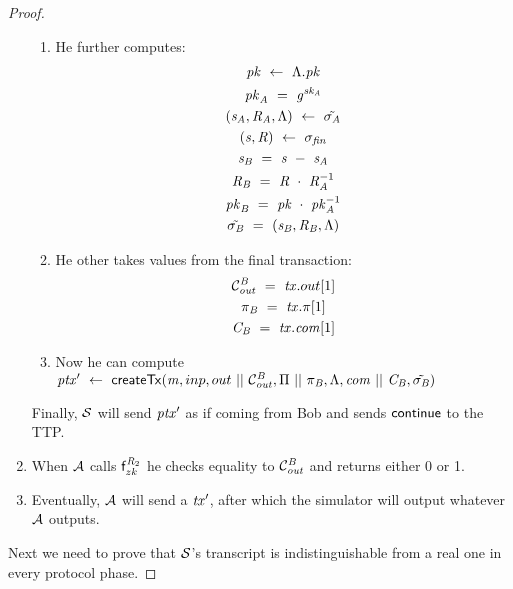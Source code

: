 \begin{proof}
\begin{enumerate}
\begin{enumerate}
            \item He further computes:
            \begin{gather*}
                \mathit{pk} ~\leftarrow~ \Lambda.\mathit{pk} \\
                \mathit{pk}_{\mathit{A}} ~=~ \mathit{g}^{\mathit{sk}_{\mathit{A}}} \\
                (\mathit{s}_{\mathit{A}}, \mathit{R}_{\mathit{A}}, \Lambda) ~\leftarrow~ \tilde{\sigma_{\mathit{A}}} \\
                (\mathit{s}, \mathit{R}) ~\leftarrow~ \sigma_{\mathit{fin}} \\
                \mathit{s}_{\mathit{B}} ~=~ \mathit{s} ~-~ \mathit{s}_{\mathit{A}} \\
                \mathit{R}_{\mathit{B}} ~=~ \mathit{R} ~\cdot~ \mathit{R}_{\mathit{A}}^{-1} \\
                \mathit{pk}_{\mathit{B}} ~=~ \mathit{pk} ~\cdot~ \mathit{pk}_{\mathit{A}}^{-1} \\
                \tilde{\sigma_{\mathit{B}}} ~=~ (\mathit{s}_{\mathit{B}}, \mathit{R}_{\mathit{B}}, \Lambda)
            \end{gather*}
            \item He other takes values from the final transaction:
            \begin{gather*}
                \mathcal{C}_{\mathit{out}}^{\mathit{B}} ~=~ \mathit{tx}.out[1] \\
                \pi_{\mathit{B}} ~=~ \mathit{tx}.\pi[1] \\
                \mathit{C}_{\mathit{B}} ~=~ \mathit{tx}.\mathit{com}[1]
            \end{gather*}
            \item Now he can compute ${\mathit{ptx}}' ~\leftarrow~ \mathsf{createTx}(\mathit{m},inp,out ~||~ \mathcal{C}_{\mathit{out}}^{\mathit{B}},\Pi ~||~ \pi_{\mathit{B}},\Lambda,\mathit{com} ~||~ \mathit{C}_{\mathit{B}},\tilde{\sigma_{\mathit{B}}})$
        \end{enumerate}
        Finally, $\mathcal{S}$ will send ${\mathit{ptx}}'$ as if coming from Bob and sends $\mathsf{continue}$ to the TTP.
        \item When $\mathcal{A}$ calls $\mathsf{f}^{\mathit{R}_2}_{zk}$ he checks equality to $\mathcal{C}_{\mathit{out}}^{\mathit{B}}$ and returns either 0 or 1.
        \item Eventually, $\mathcal{A}$ will send a ${\mathit{tx}}'$, after which the simulator will output whatever $\mathcal{A}$ outputs.
    \end{enumerate}
    Next we need to prove that $\mathcal{S}$'s transcript is indistinguishable from a real one in every protocol phase.

\end{proof}
